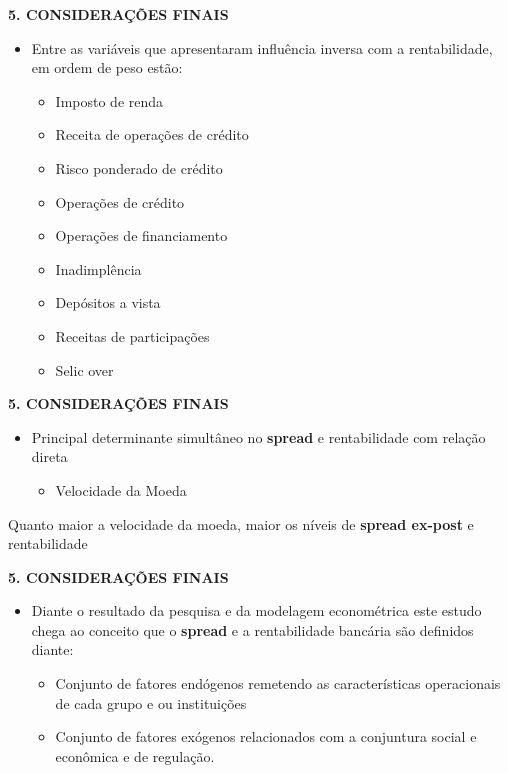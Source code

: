 \documentclass[
  ignorenonframetext,
  aspectratio=169,
  ignorenonframetext]{beamer}
\providecommand{\tightlist}{%
  \setlength{\itemsep}{0pt}\setlength{\parskip}{0pt}}
\begin{document}
\begin{frame}{\textbf{5. CONSIDERAÇÕES FINAIS}}
\protect\hypertarget{considerauxe7uxf5es-finais-5}{}
\begin{itemize}
\tightlist
\item
  Entre as variáveis que apresentaram influência inversa com a
  rentabilidade, em ordem de peso estão:

  \begin{itemize}
  \tightlist
  \item
    Imposto de renda
  \item
    Receita de operações de crédito
  \item
    Risco ponderado de crédito
  \item
    Operações de crédito
  \item
    Operações de financiamento
  \item
    Inadimplência
  \item
    Depósitos a vista
  \item
    Receitas de participações
  \item
    Selic over
  \end{itemize}
\end{itemize}
\end{frame}

\begin{frame}{\textbf{5. CONSIDERAÇÕES FINAIS}}
\protect\hypertarget{considerauxe7uxf5es-finais-6}{}
\begin{itemize}
\tightlist
\item
  Principal determinante simultâneo no \textbf{spread} e rentabilidade
  com relação direta

  \begin{itemize}
  \tightlist
  \item
    Velocidade da Moeda
  \end{itemize}
\end{itemize}

Quanto maior a velocidade da moeda, maior os níveis de \textbf{spread
ex-post} e rentabilidade
\end{frame}

\begin{frame}{\textbf{5. CONSIDERAÇÕES FINAIS}}
\protect\hypertarget{considerauxe7uxf5es-finais-7}{}
\begin{itemize}
\tightlist
\item
  Diante o resultado da pesquisa e da modelagem econométrica este estudo
  chega ao conceito que o \textbf{spread} e a rentabilidade bancária são
  definidos diante:

  \begin{itemize}
  \tightlist
  \item
    Conjunto de fatores endógenos remetendo as características
    operacionais de cada grupo e ou instituições
  \item
    Conjunto de fatores exógenos relacionados com a conjuntura social e
    econômica e de regulação.
  \end{itemize}
\end{itemize}
\end{frame}
\end{document}
